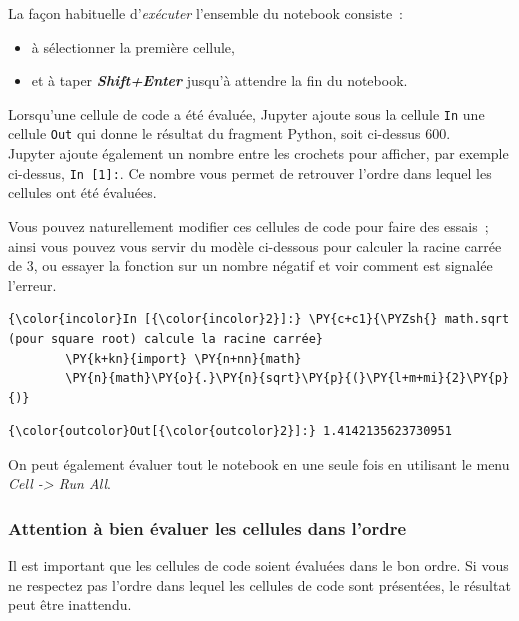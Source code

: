     La façon habituelle d'\emph{exécuter} l'ensemble du notebook consiste~:
\begin{itemize}
	\item
	à sélectionner la première cellule,
	\item
	et à taper \textbf{\emph{Shift+Enter}} jusqu'à attendre la fin du notebook.
\end{itemize}

    Lorsqu'une cellule de code a été évaluée, Jupyter ajoute sous la cellule
\texttt{In} une cellule \texttt{Out} qui donne le résultat du fragment
Python, soit ci-dessus 600.\\

Jupyter ajoute également un nombre entre les crochets pour afficher, par
exemple ci-dessus, \texttt{In\ {[}1{]}:}. Ce nombre vous permet de
retrouver l'ordre dans lequel les cellules ont été évaluées.

    Vous pouvez naturellement modifier ces cellules de code pour faire des
essais~; ainsi vous pouvez vous servir du modèle ci-dessous pour
calculer la racine carrée de 3, ou essayer la fonction sur un nombre
négatif et voir comment est signalée l'erreur.

    \begin{Verbatim}[commandchars=\\\{\}]
{\color{incolor}In [{\color{incolor}2}]:} \PY{c+c1}{\PYZsh{} math.sqrt (pour square root) calcule la racine carrée}
        \PY{k+kn}{import} \PY{n+nn}{math}
        \PY{n}{math}\PY{o}{.}\PY{n}{sqrt}\PY{p}{(}\PY{l+m+mi}{2}\PY{p}{)}
\end{Verbatim}


\begin{Verbatim}[commandchars=\\\{\}]
{\color{outcolor}Out[{\color{outcolor}2}]:} 1.4142135623730951
\end{Verbatim}
            
    On peut également évaluer tout le notebook en une seule fois en
utilisant le menu \emph{Cell -\textgreater{} Run All}.

    \hypertarget{attention-uxe0-bien-uxe9valuer-les-cellules-dans-lordre}{%
\subsubsection{Attention à bien évaluer les cellules dans
l'ordre}\label{attention-uxe0-bien-uxe9valuer-les-cellules-dans-lordre}}

    Il est important que les cellules de code soient évaluées dans le bon
ordre. Si vous ne respectez pas l'ordre dans lequel les cellules de code
sont présentées, le résultat peut être inattendu.\\

